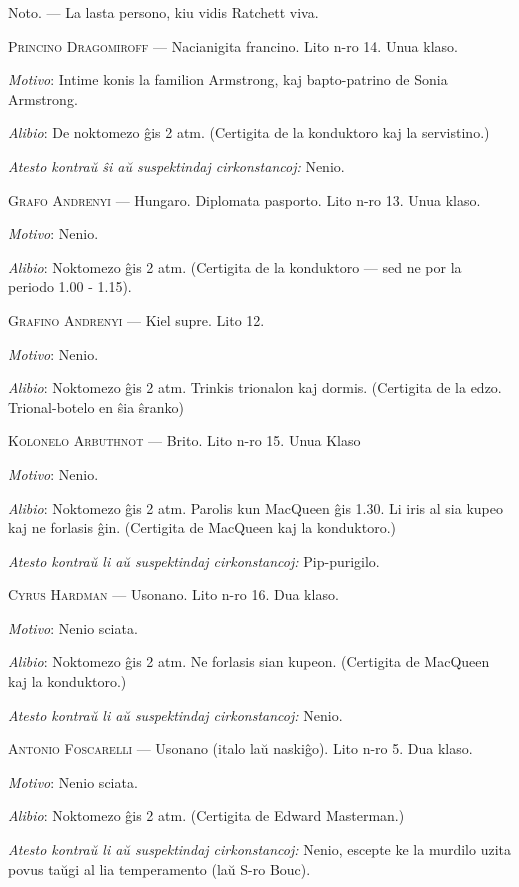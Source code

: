 \begin{addmargin}[1em]{2em}
Noto. --- La lasta persono, kiu vidis Ratchett viva.

\noindent \textsc{Princino Dragomiroff} --- Nacianigita francino. Lito n-ro 14. Unua klaso.

\emph{Motivo}: Intime konis la familion Armstrong, kaj bapto-patrino de Sonia Armstrong.

\emph{Alibio}: De noktomezo ĝis 2 atm. (Certigita de la konduktoro kaj la servistino.)

\emph{Atesto kontraŭ ŝi aŭ suspektindaj cirkonstancoj:} Nenio.

\noindent \textsc{Grafo Andrenyi }--- Hungaro. Diplomata pasporto. Lito n-ro 13. Unua klaso.

\emph{Motivo}: Nenio.

\emph{Alibio}: Noktomezo ĝis 2 atm. (Certigita de la konduktoro --- sed ne por la periodo 1.00 - 1.15).

\noindent \textsc{Grafino Andrenyi }--- Kiel supre. Lito 12.

\emph{Motivo}: Nenio.

\emph{Alibio}: Noktomezo ĝis 2 atm. Trinkis trionalon kaj dormis. (Certigita de la edzo. Trional-botelo en ŝia ŝranko)

\noindent \textsc{Kolonelo Arbuthnot} --- Brito. Lito n-ro 15. Unua Klaso

\emph{Motivo}: Nenio.

\emph{Alibio}: Noktomezo ĝis 2 atm. Parolis kun MacQueen ĝis 1.30. Li iris al sia kupeo kaj ne forlasis ĝin. (Certigita de MacQueen kaj la konduktoro.)

\emph{Atesto kontraŭ li aŭ suspektindaj cirkonstancoj:} Pip-purigilo.

\noindent \textsc{Cyrus Hardman} --- Usonano. Lito n-ro 16. Dua klaso.

\emph{Motivo}: Nenio sciata.

\emph{Alibio}: Noktomezo ĝis 2 atm. Ne forlasis sian kupeon. (Certigita de MacQueen kaj la konduktoro.)

\emph{Atesto kontraŭ li aŭ suspektindaj cirkonstancoj:} Nenio.

\noindent \textsc{Antonio Foscarelli} --- Usonano (italo laŭ naskiĝo). Lito n-ro 5. Dua klaso.

\emph{Motivo}: Nenio sciata.

\emph{Alibio}: Noktomezo ĝis 2 atm. (Certigita de Edward Masterman.)

\emph{Atesto kontraŭ li aŭ suspektindaj cirkonstancoj:} Nenio, escepte ke la murdilo uzita povus taŭgi al lia temperamento (laŭ S-ro Bouc).


\end{addmargin}
